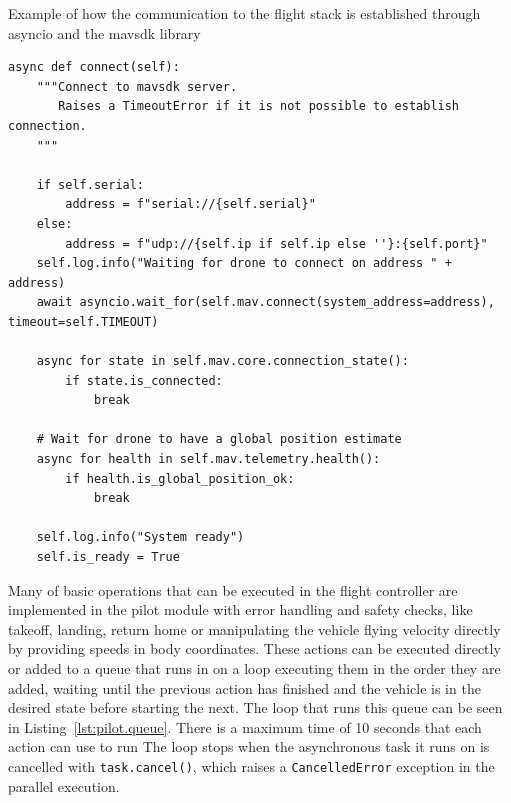 \begin{listing}[h!]
    \caption{Example of how the communication to the flight stack is established through asyncio and the mavsdk library}{}
    \label{lst:pilot.connect}
    \begin{verbatim}
async def connect(self):
    """Connect to mavsdk server.
       Raises a TimeoutError if it is not possible to establish connection.
    """
    
    if self.serial:
        address = f"serial://{self.serial}"
    else:
        address = f"udp://{self.ip if self.ip else ''}:{self.port}"
    self.log.info("Waiting for drone to connect on address " + address)
    await asyncio.wait_for(self.mav.connect(system_address=address), timeout=self.TIMEOUT)

    async for state in self.mav.core.connection_state():
        if state.is_connected:
            break

    # Wait for drone to have a global position estimate
    async for health in self.mav.telemetry.health():
        if health.is_global_position_ok:
            break
        
    self.log.info("System ready")
    self.is_ready = True
    \end{verbatim}
\end{listing}

Many of basic operations that can be executed in the flight controller are implemented in the pilot module with error handling and safety checks, like takeoff, landing, return home or manipulating the vehicle flying velocity directly by providing speeds in body coordinates.
These actions can be executed directly or added to a queue that runs in on a loop executing them in the order they are added, waiting until the previous action has finished and the vehicle is in the desired state before starting the next.
The loop that runs this queue can be seen in Listing~\ref{lst:pilot.queue}.
There is a maximum time of 10 seconds that each action can use to run
The loop stops when the asynchronous task it runs on is cancelled with \texttt{task.cancel()}, which raises a \texttt{CancelledError} exception in the parallel execution.

